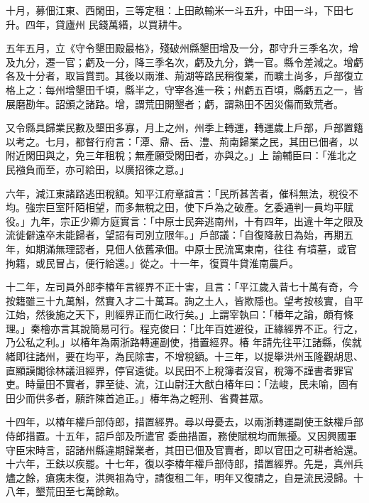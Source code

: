 \begin{pinyinscope}
 十月，募佃江東、西閑田，三等定租：上田畝輸米一斗五升，中田一斗，下田七升。四年，貸廬州
 民錢萬緡，以買耕牛。



 五年五月，立《守令墾田殿最格》，殘破州縣墾田增及一分，郡守升三季名次，增及九分，遷一官；虧及一分，降三季名次，虧及九分，鐫一官。縣令差減之。增虧各及十分者，取旨賞罰。其後以兩淮、荊湖等路民稍復業，而曠土尚多，戶部復立格上之：每州增墾田千頃，縣半之，守宰各進一秩；州虧五百頃，縣虧五之一，皆展磨勘年。詔頒之諸路。增，謂荒田開墾者；虧，謂熟田不因災傷而致荒者。



 又令縣具歸業民數及墾田多寡，月上之州，州季上轉運，轉運歲上戶部，戶部置籍以考之。七月，都督行府言：「潭、鼎、岳、澧、荊南歸業之民，其田已佃者，以附近閑田與之，免三年租稅；無產願受閑田者，亦與之。」上
 諭輔臣曰：「淮北之民襁負而至，亦可給田，以廣招徠之意。」



 六年，減江東諸路逃田稅額。知平江府章誼言：「民所甚苦者，催科無法，稅役不均。強宗巨室阡陌相望，而多無稅之田，使下戶為之破產。乞委通判一員均平賦役。」九年，宗正少卿方庭實言：「中原士民奔逃南州，十有四年，出違十年之限及流徙僻遠卒未能歸者，望詔有司別立限年。」戶部議：「自復降赦日為始，再期五年，如期滿無理認者，見佃人依舊承佃。中原士民流寓東南，往往
 有墳墓，或官拘籍，或民冒占，便行給還。」從之。十一年，復買牛貸淮南農戶。



 十二年，左司員外郎李椿年言經界不正十害，且言：「平江歲入昔七十萬有奇，今按籍雖三十九萬斛，然實入才二十萬耳。詢之土人，皆欺隱也。望考按核實，自平江始，然後施之天下，則經界正而仁政行矣。」上謂宰執曰：「椿年之論，頗有條理。」秦檜亦言其說簡易可行。程克俊曰：「比年百姓避役，正緣經界不正。行之，乃公私之利。」以椿年為兩浙路轉運副使，措置經界。椿
 年請先往平江諸縣，俟就緒即往諸州，要在均平，為民除害，不增稅額。十三年，以提舉洪州玉隆觀胡思、直顯謨閣徐林議沮經界，停官遠徙。以民田不上稅簿者沒官，稅簿不謹書者罪官吏。時量田不實者，罪至徒、流，江山尉汪大猷白椿年曰：「法峻，民未喻，固有田少而供多者，願許陳首追正。」椿年為之輕刑、省費甚眾。



 十四年，以椿年權戶部侍郎，措置經界。尋以母憂去，以兩浙轉運副使王鈇權戶部侍郎措置。十五年，詔戶部及所遣官
 委曲措置，務使賦稅均而無擾。又因興國軍守臣宋時言，詔諸州縣違期歸業者，其田已佃及官賣者，即以官田之可耕者給還。十六年，王鈇以疾罷。十七年，復以李椿年權戶部侍郎，措置經界。先是，真州兵燼之餘，瘡痍未復，洪興祖為守，請復租二年，明年又復請之，自是流民浸歸。十八年，墾荒田至七萬餘畝。




\end{pinyinscope}
